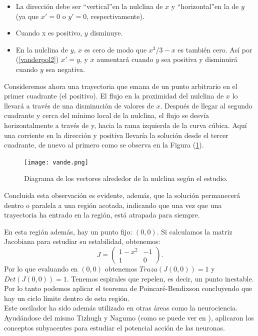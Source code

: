 \begin{itemize}
	\item La dirección debe ser \textquotedblleft vertical\textquotedblright en la nulclina de $x$ y \textquotedblleft horizontal\textquotedblright en la de $y$ (ya que $x' = 0$ o $y' = 0$, respectivamente).
	\item Cuando x es positivo, $y$ disminuye.
	\item  En la nulclina de $y$, $x$ es cero de modo que $x^3/3-x$ es también cero. Así por (\ref{vanderpol2}) $x'=y$, y $x$ aumentará cuando $y$ sea positiva y disminuirá cuando $y$ sea negativa.
\end{itemize}
Consideremos ahora una trayectoria que emana de un punto arbitrario en el primer cuadrante (el positivo). El flujo en la proximidad del nulclina de $x$ lo llevará a través de una disminución de valores de $x$. Después de llegar al segundo cuadrante y cerca del mínimo local de la nulclina, el flujo se desvía horizontalmente a través de y, hacia la rama izquierda de la curva cúbica.
Aquí una corriente en la dirección y positiva llevaría la solución desde el tercer cuadrante, de nuevo al primero como se observa en la Figura (\ref{vande}).\\
\begin{figure}[h]
	\centering
	\texttt{[image: vande.png]}
	\caption{Diagrama de los vectores alrededor de la nulclina según el estudio.  }
	\label{vande}
\end{figure}

Concluida esta observación es evidente, además, que la solución permanecerá dentro o paralela a una región acotada, indicando que una vez que una trayectoria ha entrado en la región, está atrapada para siempre. 

En esta región además, hay un punto fijo: $(0,0)$.
Si calculamos la matriz Jacobiana para estudiar su estabilidad, obtenemos:
\[ J= \begin{pmatrix} 1-x^2 & -1 \\ 1 & 0 \end{pmatrix} .\]
Por lo que evaluando en $(0,0)$ obtenemos $Traza(J(0,0))=1$ y $Det(J(0,0))=1$. Tenemos espirales que repelen, es decir, un punto inestable.\\
Por lo tanto podemos aplicar el teorema de Poincaré-Bendixson concluyendo que hay un ciclo límite dentro de esta región. \\
Este oscilador ha sido además utilizado en otras áreas como la neurociencia. Ayudándose del mismo Tizhugh y Nagumo (como se puede ver en \cite{mathmobi}), aplicaron los conceptos subyacentes para estudiar el potencial acción de las neuronas.

